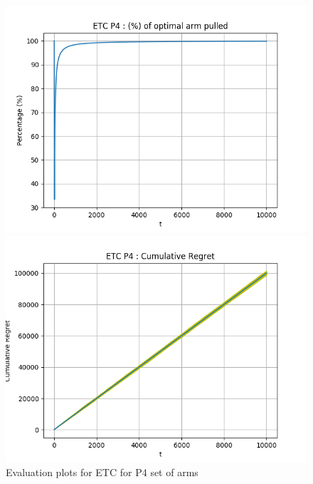\documentclass[12pt]{report}
\begin{document}
			\begin{figure}[H]
				\begin{multicols}{2}
					\includegraphics[scale=0.5]{Figures/ETC_P4_8_op.png} \par
					\includegraphics[scale=0.5]{Figures/ETC_P4_8_ret.png}
				\end{multicols}
				\caption{Evaluation plots for ETC for P4 set of arms}
				\label{Fig6}
			\end{figure}
				
\end{document}

